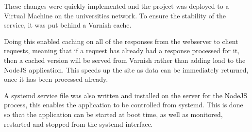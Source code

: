 These changes were quickly implemented and the project was deployed to a Virtual Machine on the universities network. To ensure the stability of the service, it was put behind a Varnish\cite{varnish} cache.

Doing this enabled caching on all of the responses from the webserver to client requests, meaning that if a request has already had a response processed for it, then a cached version will be served from Varnish rather than adding load to the NodeJS application. This speeds up the site as data can be immediately returned, once it has been processed already.

A systemd\cite{systemd} service file was also written and installed on the server for the NodeJS process, this enables the application to be controlled from systemd. This is done so that the application can be started at boot time, as well as monitored, restarted and stopped from the systemd interface. 




